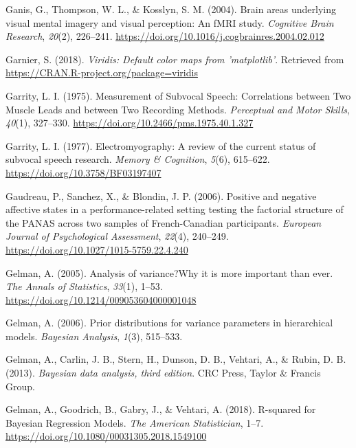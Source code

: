 \documentclass[a4paper,12pt,twoside,openright,oldfontcommands]{memoir}
\begin{document}
\leavevmode\hypertarget{ref-ganis_brain_2004}{}%
Ganis, G., Thompson, W. L., \& Kosslyn, S. M. (2004). Brain areas underlying visual mental imagery and visual perception: An fMRI study. \emph{Cognitive Brain Research}, \emph{20}(2), 226--241. \url{https://doi.org/10.1016/j.cogbrainres.2004.02.012}

\leavevmode\hypertarget{ref-R-viridis}{}%
Garnier, S. (2018). \emph{Viridis: Default color maps from 'matplotlib'}. Retrieved from \url{https://CRAN.R-project.org/package=viridis}

\leavevmode\hypertarget{ref-garrity_measurement_1975}{}%
Garrity, L. I. (1975). Measurement of Subvocal Speech: Correlations between Two Muscle Leads and between Two Recording Methods. \emph{Perceptual and Motor Skills}, \emph{40}(1), 327--330. \url{https://doi.org/10.2466/pms.1975.40.1.327}

\leavevmode\hypertarget{ref-garrity_electromyography_1977}{}%
Garrity, L. I. (1977). Electromyography: A review of the current status of subvocal speech research. \emph{Memory \& Cognition}, \emph{5}(6), 615--622. \url{https://doi.org/10.3758/BF03197407}

\leavevmode\hypertarget{ref-Gaudreau2006}{}%
Gaudreau, P., Sanchez, X., \& Blondin, J. P. (2006). Positive and negative affective states in a performance-related setting testing the factorial structure of the PANAS across two samples of French-Canadian participants. \emph{European Journal of Psychological Assessment}, \emph{22}(4), 240--249. \url{https://doi.org/10.1027/1015-5759.22.4.240}

\leavevmode\hypertarget{ref-gelman_analysis_2005}{}%
Gelman, A. (2005). Analysis of variance?Why it is more important than ever. \emph{The Annals of Statistics}, \emph{33}(1), 1--53. \url{https://doi.org/10.1214/009053604000001048}

\leavevmode\hypertarget{ref-gelman_prior_2006}{}%
Gelman, A. (2006). Prior distributions for variance parameters in hierarchical models. \emph{Bayesian Analysis}, \emph{1}(3), 515--533.

\leavevmode\hypertarget{ref-gelman_bayesian_2013}{}%
Gelman, A., Carlin, J. B., Stern, H., Dunson, D. B., Vehtari, A., \& Rubin, D. B. (2013). \emph{Bayesian data analysis, third edition}. CRC Press, Taylor \& Francis Group.

\leavevmode\hypertarget{ref-gelman_r-squared_2018}{}%
Gelman, A., Goodrich, B., Gabry, J., \& Vehtari, A. (2018). R-squared for Bayesian Regression Models. \emph{The American Statistician}, 1--7. \url{https://doi.org/10.1080/00031305.2018.1549100}
\end{document}
